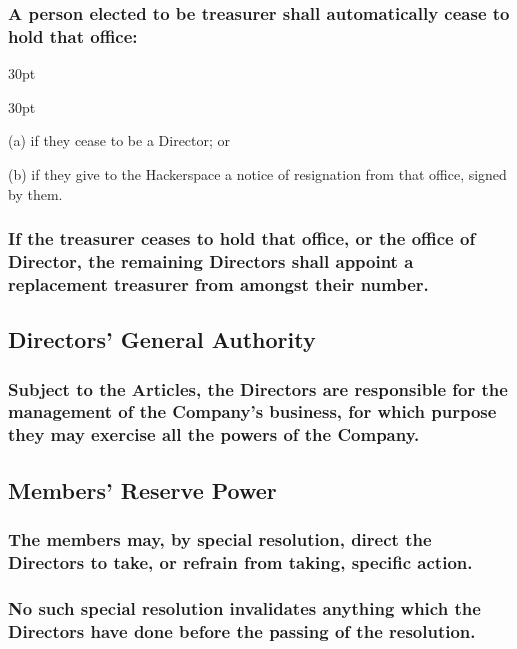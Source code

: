 \documentclass[12pt]{article}
\def\clauseindent{30pt}
\newenvironment{subindentlist}{\raggedright\begin{adjustwidth}{\clauseindent}{}\begin{labeledlist}{\clauseindent}}{\end{labeledlist}\end{adjustwidth}}
\begin{document}
\subsubsection[Automatic Termination of Treasurer]{A person elected to be treasurer shall automatically cease to hold that office:}
\begin{subindentlist}
  \item [(a)] if they cease to be a Director; or
  \item [(b)] if they give to the Hackerspace a notice of resignation from that office, signed by them.
\end{subindentlist}
\subsubsection[Replacement Treasurer Must Be Appointed]{If the treasurer ceases to hold that office, or the office of Director, the remaining Directors shall appoint a replacement treasurer from amongst their number.}

\subsection{Directors' General Authority}
\subsubsection[Directors May Exercise All Powers of the Company]{Subject to the Articles, the Directors are responsible for the management of the Company's business, for which purpose they may exercise all the powers of the Company.}

\subsection{Members' Reserve Power}
\subsubsection[Members May Instruct Directors]{The members may, by special resolution, direct the Directors to take, or refrain from taking, specific action.}
\subsubsection[Members' Instruction May Not Invalidate Directors' Actions]{No such special resolution invalidates anything which the Directors have done before the passing of the resolution.}
\end{document}
